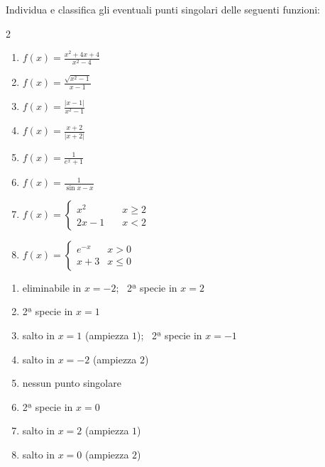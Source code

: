 \begin{question}[ID=2.5, subtitle={Punti singolari — serie 5}, tags={continuità, punti singolari}, difficulty=media]
Individua e classifica gli eventuali punti singolari delle seguenti funzioni:
\begin{center}\begin{minipage}{0.92\linewidth}
\begin{multicols}{2}
\begin{enumerate}[label=\arabic*),leftmargin=3.2cm]
\item $f(x) = \frac{x^2 + 4x + 4}{x^2 - 4}$
\item $f(x) = \frac{\sqrt{x^2 - 1}}{x-1}$
\item $f(x) = \frac{|x-1|}{x^2 - 1}$
\item $f(x) = \frac{x+2}{|x+2|}$
\item $f(x) = \frac{1}{e^x+1}$
\item $f(x) = \frac{1}{\sin x - x}$
\item $f(x) = \begin{cases} x^2 \quad & x \geq 2 \\ 2x - 1 \quad & x < 2 \end{cases}$
\item $f(x) = \begin{cases} e^{-x} & x > 0 \\ x + 3 & x \le 0 \end{cases}$
\end{enumerate}
\end{multicols}
\end{minipage}\end{center}
\begin{solution}
\begin{enumerate}[label=\arabic*)]
    \item eliminabile in $x=-2$; \ 2ª specie in $x=2$
    \item 2ª specie in $x=1$
    \item salto in $x=1$ (ampiezza $1$); \ 2ª specie in $x=-1$
    \item salto in $x=-2$ (ampiezza $2$)
    \item nessun punto singolare
    \item 2ª specie in $x=0$
    \item salto in $x=2$ (ampiezza $1$)
    \item salto in $x=0$ (ampiezza $2$)
\end{enumerate}
\end{solution}
\begin{explanation}

\end{explanation}
\end{question}
